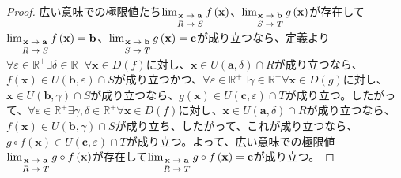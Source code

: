 \documentclass[dvipdfmx]{jsarticle}
\begin{document}
\begin{proof}
広い意味での極限値たち$\lim_{\scriptsize \begin{matrix} \mathbf{x} \rightarrow \mathbf{a} \\ R \rightarrow S \\\end{matrix}}{f\left( \mathbf{x} \right)}$、$\lim_{\scriptsize \begin{matrix} \mathbf{x} \rightarrow \mathbf{b} \\ S \rightarrow T \end{matrix}}{g\left( \mathbf{x} \right)}$が存在して$\lim_{\scriptsize \begin{matrix} \mathbf{x} \rightarrow \mathbf{a} \\ R \rightarrow S \\\end{matrix}}{f\left( \mathbf{x} \right)} = \mathbf{b}$、$\lim_{\scriptsize \begin{matrix} \mathbf{x} \rightarrow \mathbf{b} \\ S \rightarrow T \end{matrix}}{g\left( \mathbf{x} \right)} = \mathbf{c}$が成り立つなら、定義より$\forall\varepsilon \in \mathbb{R}^{+}\exists\delta \in \mathbb{R}^{+}\forall\mathbf{x} \in D(f)$に対し、$\mathbf{x} \in U\left( \mathbf{a},\delta \right) \cap R$が成り立つなら、$f\left( \mathbf{x} \right) \in U\left( \mathbf{b},\varepsilon \right) \cap S$が成り立つかつ、$\forall\varepsilon \in \mathbb{R}^{+}\exists\gamma \in \mathbb{R}^{+}\forall\mathbf{x} \in D(g)$に対し、$\mathbf{x} \in U\left( \mathbf{b},\gamma \right) \cap S$が成り立つなら、$g\left( \mathbf{x} \right) \in U\left( \mathbf{c},\varepsilon \right) \cap T$が成り立つ。したがって、$\forall\varepsilon \in \mathbb{R}^{+}\exists\gamma,\delta \in \mathbb{R}^{+}\forall\mathbf{x} \in D(f)$に対し、$\mathbf{x} \in U\left( \mathbf{a},\delta \right) \cap R$が成り立つなら、$f\left( \mathbf{x} \right) \in U\left( \mathbf{b},\gamma \right) \cap S$が成り立ち、したがって、これが成り立つなら、$g \circ f\left( \mathbf{x} \right) \in U\left( \mathbf{c},\varepsilon \right) \cap T$が成り立つ。よって、広い意味での極限値$\lim_{\scriptsize \begin{matrix} \mathbf{x} \rightarrow \mathbf{a} \\ R \rightarrow T \end{matrix}}{g \circ f\left( \mathbf{x} \right)}$が存在して$\lim_{\scriptsize \begin{matrix} \mathbf{x} \rightarrow \mathbf{a} \\ R \rightarrow T \end{matrix}}{g \circ f\left( \mathbf{x} \right)} = \mathbf{c}$が成り立つ。
\end{proof}
\end{document}
